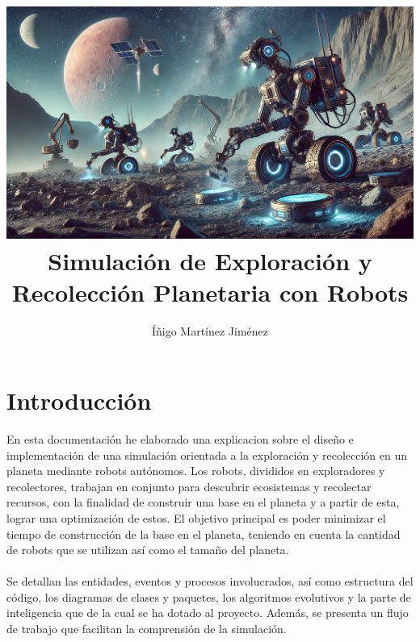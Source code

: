 \documentclass[a4paper,12pt]{article}
\title{
    \includegraphics[width=1\textwidth]{images/portada.jpg} \\ 
    \vspace{3cm}
    \textbf{Simulación de Exploración y Recolección Planetaria con Robots}\\[0.5cm]
}
\author{Íñigo Martínez Jiménez}
\date{}
\begin{document}
\maketitle



\newpage
\section*{Introducción}
En esta documentación he elaborado una explicacion sobre el diseño e implementación de una simulación orientada a la exploración y recolección en un planeta  mediante robots autónomos. Los robots, divididos en exploradores y recolectores, trabajan en conjunto para descubrir ecosistemas y recolectar recursos, con la finalidad de construir una base en el planeta y a partir de esta, lograr una optimización de estos. El objetivo principal es poder minimizar el tiempo de construcción de la base en el planeta, teniendo en cuenta la cantidad de robots que se utilizan así como el tamaño del planeta.\\\\

Se detallan las entidades, eventos y procesos involucrados, así como estructura del código, los diagramas de clases y paquetes, los algoritmos evolutivos y la parte de inteligencia que de la cual se ha dotado al proyecto. Además, se presenta un flujo de trabajo que facilitan la comprensión de la simulación.\\\\ 
\tableofcontents
\newpage
\end{document}
